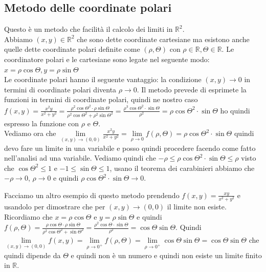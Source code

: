 \subsection{Metodo delle coordinate polari}
Questo è un metodo che facilità il calcolo dei limiti in $\mathbb{R}^2$. \\
Abbiamo $(x,y) \in \mathbb{R}^2$ che sono dette coordinate cartesiane ma esistono anche quelle dette coordinate polari definite come $(\rho,\Theta)$ con $\rho \in \mathbb{R}, \Theta \in \mathbb{R}$. Le coordinatore polari e le cartesiane sono legate nel seguente modo: $x = \rho \cos{\Theta}, y = \rho \sin{\Theta}$\\
Le coordinate polari hanno il seguente vantaggio: la condizione $(x,y)\to 0$ in termini di coordinate polari diventa $\rho \to 0$. Il metodo prevede di esprimete la funzioni in termini di coordinate polari, quindi ne nostro caso $f(x,y) = \frac{x^2y}{x^2 + y^2} = \frac{\rho^2\cos{\Theta}^2 \cdot \rho\sin{\Theta}}{\rho^2 \cos{\Theta}^2 + \rho^2\sin{\Theta}^2} = \frac{\rho^3 \cos{\Theta}^2 \cdot \sin{\Theta}}{\rho^2} = \rho \cos{\Theta}^2 \cdot \sin{\Theta}$ ho quindi espresso la funzione con $\rho$ e $\Theta$.\\
Vediamo ora che $\lim\limits_{(x,y)\to (0,0)}\frac{x^2y}{x^2 + y^2} = \lim\limits_{\rho \to 0}f(\rho, \Theta) = \rho \cos{\Theta}^2 \cdot \sin{\Theta}$ quindi devo fare un limite in una variabile e posso quindi procedere facendo come fatto nell'analisi ad una variabile. Vediamo quindi che $-\rho \leq \rho \cos{\Theta}^2 \cdot \sin{\Theta} \leq \rho$ visto che $\cos{\Theta}^2 \leq 1$ e $-1 \leq \sin{\Theta} \leq 1$, usano il teorema dei carabinieri abbiamo che $-\rho \to 0$, $\rho \to 0$ e quindi $\rho \cos{\Theta}^2 \cdot \sin{\Theta} \to 0$.

\begin{example}
Facciamo un altro esempio di questo metodo prendendo $f(x,y) = \frac{xy}{x^2 + y^2}$ e usandolo per dimostrare che per $(x,y)\to (0,0)$ il limite non esiste. Ricordiamo che $x = \rho\cos{\Theta}$ e $y = \rho\sin{\Theta}$ e quindi $f(\rho, \Theta) = \frac{\rho\cos{\Theta} \cdot \rho\sin{\Theta}}{\rho^2\cos{\Theta}^2 + \sin{\Theta}^2} = \frac{\rho^2\cos{\Theta} \cdot \sin{\Theta}}{\rho^2} = \cos{\Theta}\sin{\Theta}$. Quindi $\lim\limits_{(x,y)\to (0,0)}f(x,y) = \lim\limits_{\rho\to 0^+}f(\rho, \Theta) = \lim\limits_{\rho\to 0^+}\cos{\Theta}\sin{\Theta} = \cos{\Theta}\sin{\Theta}$ che quindi dipende da $\Theta$ e quindi non è un numero e quindi non esiste un limite finito in $\mathbb{R}$.
\end{example}

